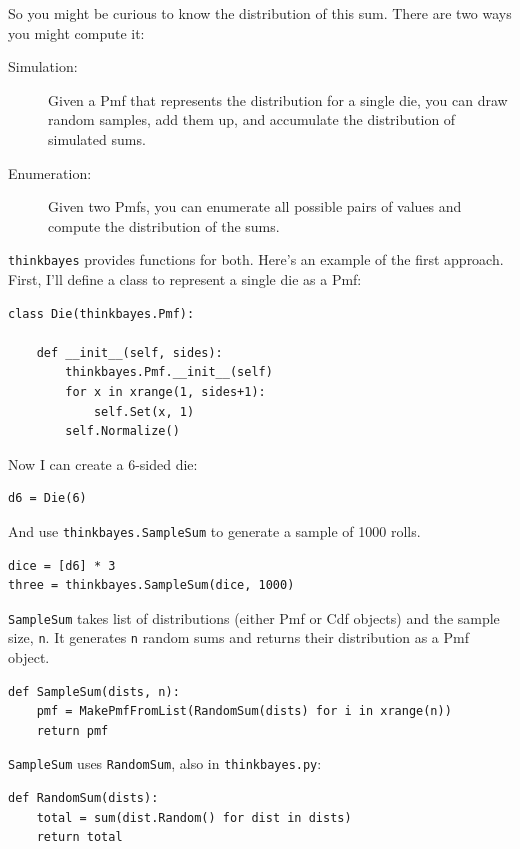 \documentclass[12pt]{book}
\begin{document}
So you might be curious to know the distribution of this sum.
There are two ways you might compute it:

\begin{description}

\item[Simulation:] Given a Pmf that represents the distribution
for a single die, you can draw random samples, add them up,
and accumulate the distribution of simulated sums.

\item[Enumeration:] Given two Pmfs, you can enumerate all possible
pairs of values and compute the distribution of the sums.

\end{description}

\verb"thinkbayes" provides functions for both.  Here's an example
of the first approach.  First, I'll define a class to represent
a single die as a Pmf:

\begin{verbatim}
class Die(thinkbayes.Pmf):

    def __init__(self, sides):
        thinkbayes.Pmf.__init__(self)
        for x in xrange(1, sides+1):
            self.Set(x, 1)
        self.Normalize()
\end{verbatim}

Now I can create a 6-sided die:

\begin{verbatim}
d6 = Die(6)
\end{verbatim}

And use \verb"thinkbayes.SampleSum" to generate a sample of 1000 rolls.

\begin{verbatim}
dice = [d6] * 3
three = thinkbayes.SampleSum(dice, 1000)
\end{verbatim}

\verb"SampleSum" takes list of distributions (either Pmf or Cdf
objects) and the sample size, {\tt n}.  It generates {\tt n} random
sums and returns their distribution as a Pmf object.

\begin{verbatim}
def SampleSum(dists, n):
    pmf = MakePmfFromList(RandomSum(dists) for i in xrange(n))
    return pmf
\end{verbatim}

\verb"SampleSum" uses \verb"RandomSum", also in \verb"thinkbayes.py":

\begin{verbatim}
def RandomSum(dists):
    total = sum(dist.Random() for dist in dists)
    return total
\end{verbatim}
\end{document}
